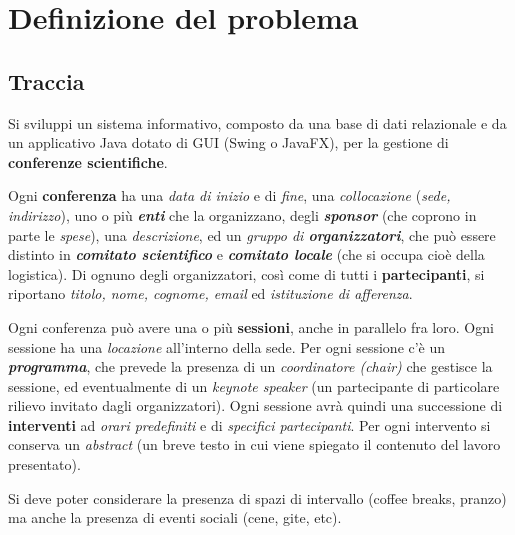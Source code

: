 \chapter{Definizione del problema}
\section{Traccia}
Si sviluppi un sistema informativo, composto da una base di dati relazionale e da un applicativo Java dotato
di GUI (Swing o JavaFX), per la gestione di \textbf{conferenze scientifiche}. 
\bigskip

Ogni \textbf{conferenza} ha una \textit{data di inizio} e di
\textit{fine}, una \textit{collocazione} (\textit{sede, indirizzo}), uno o più \textit{\textbf{enti}} che la organizzano, degli \textbf{\textit{sponsor}} (che coprono in parte le \textit{spese}), una \textit{descrizione}, ed un \textit{gruppo di \textbf{organizzatori}}, che può essere distinto in \textbf{\textit{comitato scientifico}} e \textbf{\textit{comitato locale}} (che si occupa cioè della logistica). Di ognuno degli organizzatori, così come di tutti i \textbf{partecipanti}, si riportano \textit{titolo, nome, cognome, email} ed \textit{istituzione di afferenza}. 
\bigskip

Ogni conferenza può avere una o più \textbf{sessioni}, anche in parallelo fra loro. Ogni sessione ha una \textit{locazione} all'interno della sede. Per ogni
sessione c'è un \textbf{\textit{programma}}, che prevede la presenza di un \textit{coordinatore (chair)} che gestisce la sessione, ed eventualmente di un \textit{keynote speaker} (un partecipante di particolare rilievo invitato dagli organizzatori). Ogni sessione avrà quindi una successione di \textbf{interventi} ad \textit{orari predefiniti} e di \textit{specifici partecipanti}. Per ogni intervento si conserva un \textit{abstract} (un breve testo in cui viene spiegato il contenuto del lavoro presentato).
\bigskip

Si deve poter considerare la presenza di spazi di intervallo (coffee breaks, pranzo) ma anche la presenza di eventi sociali (cene, gite, etc).
